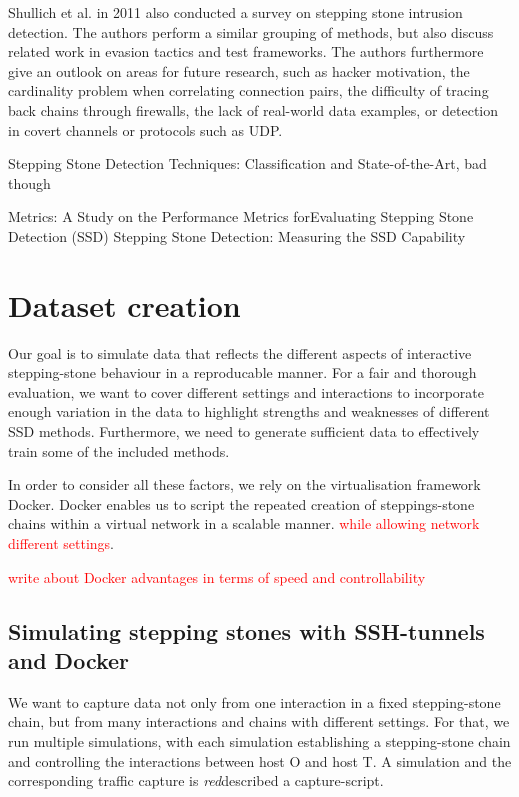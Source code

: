 \documentclass[conference]{IEEEtran}\usepackage[]{graphicx}\usepackage[]{color}
\begin{document}
Shullich et al. \cite{shullich2011survey} in 2011 also conducted a survey on stepping stone intrusion detection. The authors perform a similar grouping of methods, but also discuss related work in evasion tactics and test frameworks. The authors furthermore give an outlook on areas for future research, such as hacker motivation, the cardinality problem when correlating connection pairs, the difficulty of tracing back chains through firewalls, the lack of real-world data examples, or detection in covert channels or protocols such as UDP.  

\cite{almulhem2007survey}

Stepping Stone Detection Techniques: Classification and State-of-the-Art, bad though

Metrics: A Study on the Performance Metrics forEvaluating Stepping Stone Detection (SSD)
Stepping Stone Detection: Measuring the SSD Capability


\section{Dataset creation}\label{Sec:Datasetcreation}

Our goal is to simulate data that reflects the different aspects of interactive stepping-stone behaviour in a reproducable manner. For a fair and thorough evaluation, we want to cover different settings and interactions to incorporate enough variation in the data to highlight strengths and weaknesses of different SSD methods. Furthermore, we need to generate sufficient data to effectively train some of the included methods. 

In order to consider all these factors, we rely on the virtualisation framework Docker. Docker enables us to script the repeated creation of steppings-stone chains within a virtual network in a scalable manner. \textcolor{red}{while allowing network different settings}. 

\textcolor{red}{write about Docker advantages in terms of speed and controllability}

\subsection{Simulating stepping stones with SSH-tunnels and Docker}\label{Sec:Setup}

We want to capture data not only from one interaction in a fixed stepping-stone chain, but from many interactions and chains with different settings. For that, we run multiple simulations, with each simulation establishing a stepping-stone chain and controlling the interactions between host O and host T. A simulation and the corresponding traffic capture is \textit{red}{described} a capture-script. 
\end{document}
